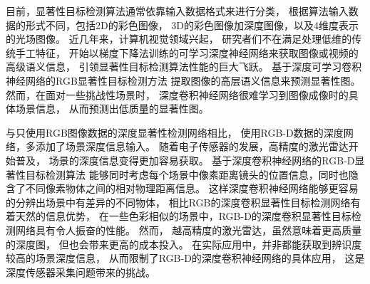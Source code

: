 



目前，显著性目标检测算法通常依靠输入数据格式来进行分类，
根据算法输入数据的形式不同，包括2D的彩色图像，
3D的彩色图像加深度图像，以及4维度表示的光场图像。
近几年来，计算机视觉领域兴起，
研究者们不在满足处理低维的传统手工特征，
开始以梯度下降法训练的可学习深度神经网络来获取图像或视频的高级语义信息，
引领显著性目标检测算法性能的巨大飞跃。
基于深度可学习卷积神经网络的RGB显著性目标检测方法
提取图像的高层语义信息来预测显著性图。
然而，在面对一些挑战性场景时，
深度卷积神经网络很难学习到图像成像时的具体场景信息，
从而预测出低质量的显著性图。



与只使用RGB图像数据的深度显著性检测网络相比，
使用RGB-D数据的深度网络，多添加了场景深度信息输入。
随着电子传感器的发展，高精度的激光雷达开始普及，
场景的深度信息变得更加容易获取。
基于深度卷积神经网络的RGB-D显著性目标检测算法
能够同时考虑每个场景中像素距离镜头的位置信息，同时也隐含了不同像素物体之间的相对物理距离信息。
这样深度卷积神经网络能够更容易的分辨出场景中有差异的不同物体，
相比RGB的深度卷积显著性目标检测网络有着天然的信息优势，
在一些色彩相似的场景中，RGB-D的深度卷积显著性目标检测网络具有令人振奋的性能。
然而，
越高精度的激光雷达，虽然意味着更高质量的深度图，
但也会带来更高的成本投入。
在实际应用中，并非都能获取到辨识度较高的场景深度信息，
从而限制了RGB-D的深度卷积神经网络的具体应用，
这是深度传感器采集问题带来的挑战。






